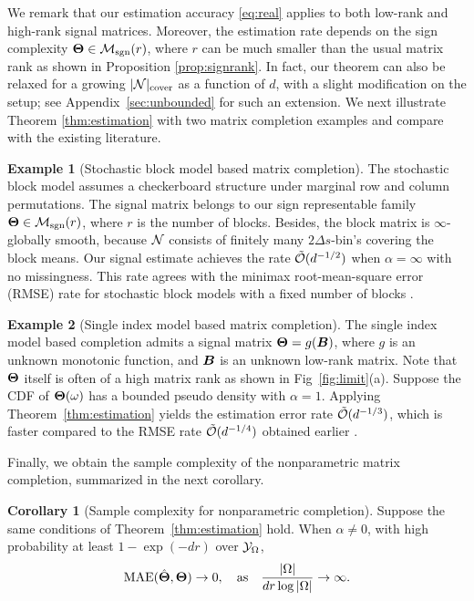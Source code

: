 \documentclass[aos]{imsart}
\theoremstyle{definition}
\newtheorem{corollary}{Corollary}
\newtheorem{example}{Example}
\def\caliM{\tM_{\textup{sgn}}}
\begin{document}
\noindent
We remark that our estimation accuracy \eqref{eq:real} applies to both low-rank and high-rank signal matrices. Moreover, the estimation rate depends on the sign complexity $\mTheta\in\caliM(r)$, where $r$ can be much smaller than the usual matrix rank as shown in Proposition \ref{prop:signrank}. In fact, our theorem can also be relaxed for a growing $|\mathcal{N}|_{\text{cover}}$ as a function of $d$, with a slight modification on the setup; see Appendix~\ref{sec:unbounded} for such an extension. We next illustrate Theorem \ref{thm:estimation} with two matrix completion examples and compare with the existing literature.  

\begin{example}[Stochastic block model based matrix completion]
The stochastic block model \cite{chi2020provable} assumes a checkerboard structure under marginal row and column permutations. The signal matrix belongs to our sign representable family $\mTheta \in \caliM(r)$, where $r$ is the number of blocks. Besides, the block matrix is $\infty$-globally smooth, because $\mathcal{N}$ consists of finitely many $2\Delta s$-bin's covering the block means. Our signal estimate achieves the rate $\tilde {\mathcal{O}}(d^{-1/2})$ when $\alpha=\infty$ with no missingness. This rate agrees with the minimax root-mean-square error (RMSE) rate for stochastic block models with a fixed number of blocks \cite{gao2016optimal}. 
\end{example}

\begin{example}[Single index model based matrix completion]
The single index model based completion \cite{ganti2015matrix} admits a signal matrix $\bm{\Theta}=g(\bm B)$, where $g$ is an unknown monotonic function, and $\bm B$ is an unknown low-rank matrix. Note that $\bm{\Theta}$ itself is often of a high matrix rank as shown in Fig~\ref{fig:limit}(a). Suppose the CDF of $\bm{\Theta}(\omega)$ has a bounded pseudo density with $\alpha=1$. Applying Theorem~\ref{thm:estimation} yields the estimation error rate $\tilde {\mathcal{O}}(d^{-1/3})$, which is faster compared to the RMSE rate $\tilde {\mathcal{O}}(d^{-1/4})$ obtained earlier \cite{ganti2015matrix}. 
\end{example}

Finally, we obtain the sample complexity of the nonparametric matrix completion, summarized in the next corollary.

\begin{corollary}[Sample complexity for nonparametric completion] \label{thm:sample-complexity}
Suppose the same conditions of Theorem~\ref{thm:estimation} hold. When $\alpha\neq 0$, with high probability at least $1-\exp(-dr)$ over $\mathcal{Y}_\Omega$, 
\begin{equation*}
\textup{MAE}(\hat \mTheta, \mTheta)\to 0, \quad \text{as}\quad {|\Omega|\over {d} r \log|\Omega|}\to \infty.
\end{equation*}
\end{corollary}
\end{document}

